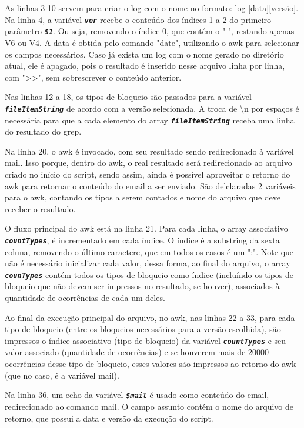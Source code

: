 \documentclass[oneside, 11 pt]{article}
\begin{document}
	As linhas 3-10 servem para criar o log com o nome no formato: log-[data][versão]. Na linha 4, a variável \texttt{\textbf{\textit{ver}}} recebe o conteúdo dos índices 1 a 2 do primeiro parâmetro \texttt{\textbf{\textit{\$1}}}. Ou seja, removendo o índice 0, que contém o "-", restando apenas V6 ou V4. A data é obtida pelo comando "date", utilizando o awk para selecionar os campos necessários. Caso já exista um log com o nome gerado no diretório atual, ele é apagado, pois o resultado é inserido nesse arquivo linha por linha, com ">>", sem sobrescrever o conteúdo anterior.
	
	Nas linhas 12 a 18, os tipos de bloqueio são passados para a variável \texttt{\textbf{\textit{fileItemString}}} de acordo com a versão selecionada. A troca de \textbackslash n por espaços é necessária para que a cada elemento do array \texttt{\textbf{\textit{fileItemString}}} receba uma linha do resultado do grep.
	
	Na linha 20, o awk é invocado, com seu resultado sendo redirecionado à variável mail. Isso porque, dentro do awk, o real resultado será redirecionado ao arquivo criado no início do script, sendo assim, ainda é possível aproveitar o retorno do awk para retornar o conteúdo do email a ser enviado. São delclaradas 2 variáveis para o awk, contando os tipos a serem contados e nome do arquivo que deve receber o resultado.
	
	O fluxo principal do awk está na linha 21. Para cada linha, o array associativo \texttt{\textbf{\textit{countTypes}}}, é incrementado em cada índice. O índice é a substring da sexta coluna, removendo o último caractere, que em todos os casos é um ":". Note que não é necessário inicializar cada valor, dessa forma, ao final do arquivo, o array \texttt{\textbf{\textit{counTypes}}} contém todos os tipos de bloqueio como índice (incluíndo os tipos de bloqueio que não devem ser impressos no resultado, se houver), associados à quantidade de ocorrências de cada um deles.
	
	Ao final da execução principal do arquivo, no awk, nas linhas 22 a 33, para cada tipo de bloqueio (entre os bloqueios necessários para a versão escolhida), são impressos o índice associativo (tipo de bloqueio) da variável \texttt{\textbf{\textit{countTypes}}} e seu valor associado (quantidade de ocorrências) e se houverem mais de 20000 ocorrências desse tipo de bloqueio, esses valores são impressos ao retorno do awk (que no caso, é a variável mail).
	
	Na linha 36, um echo da variável \texttt{\textbf{\textit{\$mail}}} é usado como conteúdo do email, redirecionado ao comando mail. O campo assunto contém o nome do arquivo de retorno, que possui a data e versão da execução do script.
	
\end{document}
